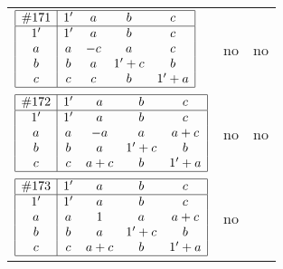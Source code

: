 \documentclass[12pt]{article}
\newcommand{\join}{\mathbin{+}}%
\newcommand{\id}{{1'}}%
\renewcommand{\top}{1}%
\begin{document}
\begin{center}
\begin{longtable}{l|c|c}
$
\begin{array}{|c|cccc|} \hline
\#171 & \id & a & b & c \\ \hline
\id & \id & a & b & c \\
a & a & -c & a & c \\
b & b & a & \id \join c & b \\
c & c & c & b & \id \join a \\ \hline
\end{array}
$
 & no  
 & no      \\[15mm]

$
\begin{array}{|c|cccc|} \hline
\#172 & \id & a & b & c \\ \hline
\id & \id & a & b & c \\
a & a & -a & a & a \join c \\
b & b & a & \id \join c & b \\
c & c & a \join c & b & \id \join a \\ \hline
\end{array}
$
 & no  
 & no      \\[15mm]

$
\begin{array}{|c|cccc|} \hline
\#173 & \id & a & b & c \\ \hline
\id & \id & a & b & c \\
a & a & \top & a & a \join c \\
b & b & a & \id \join c & b \\
c & c & a \join c & b & \id \join a \\ \hline
\end{array}
$
 & no  
 & \adjustbox{valign=c, max height=1.6cm}{$
\left[ \begin{array}{cccccc}
\id & a & a & b & c & a \\ 
a & \id & a & a & a & c \\ 
a & a & \id & a & a & c \\ 
b & a & a & \id & b & a \\ 
c & a & a & b & \id & a \\ 
a & c & c & a & a & \id
\end{array}\right]
$}      \\[15mm]


\end{longtable}
\end{center}
\end{document}
